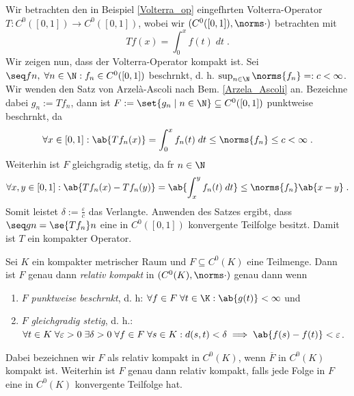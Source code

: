 \begin{ex}
	Wir betrachten den in Beispiel \ref{Volterra_op} eingef\us hrten Volterra-Operator \(T: C^0([0,1])\to C^0([0,1])\), wobei wir \((C^0([0,1]),\norms\cdot)\) betrachten mit 
	\[Tf(x) = \int_0^x f(t) \; dt\;.\]
	Wir zeigen nun, dass der Volterra-Operator kompakt ist. Sei \(\seq fn,\; \forall n \in \N: f_n \in C^0([0,1])\) beschr\as nkt, d. h. \(\sup_{n\in \N} \norms{f_n} =: c < \infty\). Wir wenden den Satz von Arzel\`a-Ascoli nach Bem. \ref{Arzela_Ascoli} an. Bezeichne dabei \(g_n := Tf_n\), dann ist \(F:=\set{g_n \;\vert\; n\in \N}\subseteq C^0([0,1])\) punktweise beschr\as nkt, da
	\[\forall x \in [0,1]: \ab{Tf_n(x)} = \int_0^x f_n(t)\; dt \leq \norms{f_n} \leq c < \infty\;.\]
	Weiterhin ist $F$ gleichgradig stetig, da f\us r \(n\in\N\)
	\[\forall x, y \in [0,1]: \ab{Tf_n(x) - Tf_n(y)} = \ab{\int_x^y f_n(t)\;dt} \leq \norms{f_n} \ab{x-y}\;.\]
	Somit leistet \(\delta := \frac{\varepsilon}{c}\) das Verlangte. Anwenden des Satzes ergibt, dass \(\seq gn = \se{Tf_n}n\) eine in \(C^0([0,1])\) konvergente Teilfolge besitzt. Damit ist $T$ ein kompakter Operator.
\end{ex}
\begin{rem}
	\label{Arzela_Ascoli}
	Sei $K$ ein kompakter metrischer Raum und \(F \subseteq C^0(K)\) eine Teilmenge. Dann ist $F$ genau dann \textit{relativ kompakt} in \((C^0(K), \norms\cdot)\) genau dann wenn
	\begin{enumerate}[noitemsep]
		\item $F$ \textit{punktweise beschr\as nkt}, d. h:  \(\forall f \in F\;\forall t\in \K: \ab{g(t)} < \infty\) \;\;  und 
		\item $F$ \textit{gleichgradig stetig}, d. h.: \(\forall t \in K\;\forall \varepsilon > 0 \; \exists \delta > 0 \;\forall f\in F \; \forall s \in K: d(s,t) < 
		\delta \implies \ab{f(s) - f(t)} < \varepsilon\)\;. 
	\end{enumerate}
	Dabei bezeichnen wir $F$ als relativ kompakt in $C^0(K)$, wenn $\overline{F}$ in $C^0(K)$ kompakt ist. Weiterhin ist $F$ genau dann relativ kompakt, falls jede Folge in $F$ eine in $C^0(K)$ konvergente Teilfolge hat. 
\end{rem}
